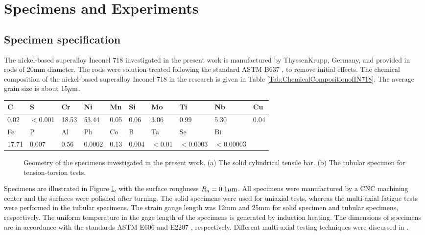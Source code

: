 \documentclass[preprint,5p,twocolumn,11pt,sort&compress]{elsarticle}
\begin{document}
\section{Specimens and Experiments}

\subsection{Specimen specification}
\noindent The nickel-based superalloy Inconel 718 investigated in the present work is manufactured by ThyssenKrupp, Germany, and provided in rods of 20mm diameter. The rods were solution-treated following the standard ASTM B637 \cite{ASTMB63716}, to remove initial effects.
The chemical composition of the nickel-based superalloy Inconel 718 in the research is given in Table \ref{Tab:ChemicalCompositionofIN718}. The average grain size is about 15$\rm{\mu m}$.

\begin{table*}[htbp]
  \centering
  \caption{Chemical composition of the investigated material Inconel 718 (wt. \%).}
    \begin{tabular}{llllllllll}
    \hline
    C     & S     & Cr    & Ni    & Mn    & Si    & Mo    & Ti    & Nb    & Cu \\
    \hline
    0.02  & $<$0.001 & 18.53 & 53.44 & 0.05  & 0.06  & 3.06  & 0.99  & 5.30  & 0.04 \\
    \hline
    Fe    & P     & Al    & Pb    & Co    & B     & Ta    & Se    & Bi    &  \\
    \hline
    17.71 & 0.007 & 0.56  & 0.0002 & 0.13  & 0.004 & $<$0.01 & $<$0.0003 & $<$0.00003 &  \\
    \hline
    \end{tabular}%
  \label{Tab:ChemicalCompositionofIN718}%
\end{table*}%


\begin{figure}[!htp]
\caption{Geometry of the specimens investigated in the present work. (a) The solid cylindrical tensile bar. (b) The tubular specimen for tension-torsion tests.}
\label{Fig:Specimen}
\end{figure}


Specimens are illustrated in Figure \ref{Fig:Specimen}, with the surface roughness  $R_a=0.1\rm{\mu m}$. All specimens were manufactured by a CNC machining center and the surfaces were polished after turning. The solid specimens were used for uniaxial tests, whereas the multi-axial fatigue tests were performed in the tubular specimens. The strain gauge length was 12mm and 25mm for solid specimen and tubular specimens, respectively. The uniform temperature in the gage length of the specimens is generated by induction heating. The dimensions of specimens are in accordance with the standards ASTM E606 \cite{astm2012606} and E2207 \cite{standard2007e2207}, respectively. Different multi-axial testing techniques were discussed in \cite{socie2000multiaxial}.
\end{document}
